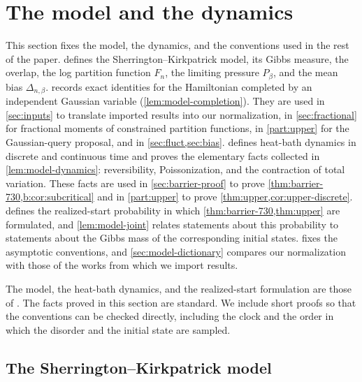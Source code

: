 \chapter{The model and the dynamics}\label{sec:model}

This section fixes the model, the dynamics, and the conventions used in the rest of the paper.
 defines the Sherrington--Kirkpatrick model, its Gibbs measure, the overlap, the log partition function $F_n$, the limiting pressure $P_\beta$, and the mean bias $\Delta_{n,\beta}$.
 records exact identities for the Hamiltonian completed by an independent Gaussian variable (\cref{lem:model-completion}). They are used in \cref{sec:inputs} to translate imported results into our normalization, in \cref{sec:fractional} for fractional moments of constrained partition functions, in \cref{part:upper} for the Gaussian-query proposal, and in \cref{sec:fluct,sec:bias}.
 defines heat-bath dynamics in discrete and continuous time and proves the elementary facts collected in \cref{lem:model-dynamics}: reversibility, Poissonization, and the contraction of total variation. These facts are used in \cref{sec:barrier-proof} to prove \cref{thm:barrier-730,b:cor:subcritical} and in \cref{part:upper} to prove \cref{thm:upper,cor:upper-discrete}.
 defines the realized-start probability in which \cref{thm:barrier-730,thm:upper} are formulated, and \cref{lem:model-joint} relates statements about this probability to statements about the Gibbs mass of the corresponding initial states.  fixes the asymptotic conventions, and \cref{sec:model-dictionary} compares our normalization with those of the works from which we import results.

The model, the heat-bath dynamics, and the realized-start formulation are those of \cite[Section~1]{oai-barriers}. The facts proved in this section are standard. We include short proofs so that the conventions can be checked directly, including the clock and the order in which the disorder and the initial state are sampled.

\section{The Sherrington--Kirkpatrick model}\label{sec:model-sk}

